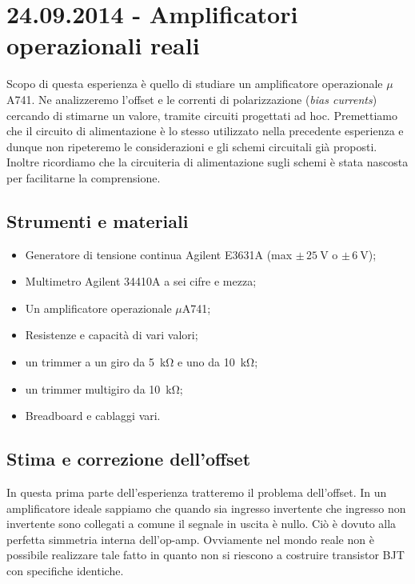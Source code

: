 \section{24.09.2014 - Amplificatori operazionali reali}

Scopo di questa esperienza è quello di studiare un amplificatore operazionale $\mu$A741.
Ne analizzeremo l'offset e le correnti di polarizzazione (\textit{bias currents}) cercando di stimarne un valore, tramite circuiti progettati ad hoc.
Premettiamo che il circuito di alimentazione è lo stesso utilizzato nella precedente esperienza e dunque non ripeteremo le considerazioni e gli schemi circuitali già proposti.
Inoltre ricordiamo che la circuiteria di alimentazione sugli schemi è stata nascosta per facilitarne la comprensione.

\subsection{Strumenti e materiali}

\begin{itemize} [noitemsep]
\item Generatore di tensione continua Agilent E3631A (max $\pm \, \SI{25}{\volt}$ o $\pm \, \SI{6}{\volt}$);
\item Multimetro Agilent 34410A a sei cifre e mezza;
\item Un amplificatore operazionale $\mu$A741;
\item Resistenze e capacità di vari valori;
\item un trimmer a un giro da \SI{5}{\kilo\ohm} e uno da \SI{10}{\kilo\ohm};
\item un trimmer multigiro da \SI{10}{\kilo\ohm};
\item Breadboard e cablaggi vari.
\end{itemize}

\subsection{Stima e correzione dell'offset}
\label{par2:offset}

In questa prima parte dell'esperienza tratteremo il problema dell'offset. In un amplificatore ideale sappiamo che quando sia ingresso invertente che ingresso non invertente sono collegati a comune il segnale in uscita è nullo. Ciò è dovuto alla perfetta simmetria interna dell'op-amp. Ovviamente nel mondo reale non è possibile realizzare tale fatto in quanto non si riescono a costruire transistor BJT con specifiche identiche. 

